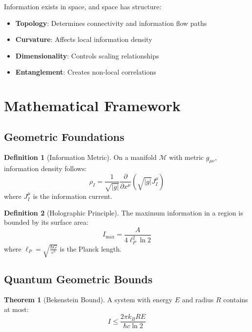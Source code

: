 \documentclass[11pt,a4paper]{article}
\theoremstyle{definition}
\newtheorem{definition}{Definition}[section]
\newtheorem{theorem}{Theorem}[section]
\begin{document}
Information exists in space, and space has structure:
\begin{itemize}
\item \textbf{Topology}: Determines connectivity and information flow paths
\item \textbf{Curvature}: Affects local information density
\item \textbf{Dimensionality}: Controls scaling relationships
\item \textbf{Entanglement}: Creates non-local correlations
\end{itemize}

\section{Mathematical Framework}

\subsection{Geometric Foundations}

\begin{definition}[Information Metric]
On a manifold $\mathcal{M}$ with metric $g_{\mu\nu}$, information density follows:
\begin{equation}
\rho_I = \frac{1}{\sqrt{|g|}} \frac{\partial}{\partial x^\mu}\left(\sqrt{|g|} J^\mu_I\right)
\end{equation}
where $J^\mu_I$ is the information current.
\end{definition}

\begin{definition}[Holographic Principle]
The maximum information in a region is bounded by its surface area:
\begin{equation}
I_{\text{max}} = \frac{A}{4\ell_P^2 \ln 2}
\end{equation}
where $\ell_P = \sqrt{\frac{\hbar G}{c^3}}$ is the Planck length.
\end{definition}

\subsection{Quantum Geometric Bounds}

\begin{theorem}[Bekenstein Bound]
A system with energy $E$ and radius $R$ contains at most:
\begin{equation}
I \leq \frac{2\pi k_B R E}{\hbar c \ln 2}
\end{equation}
\end{theorem}
\end{document}
